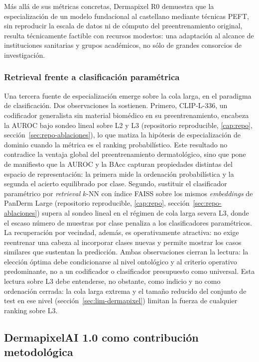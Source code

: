 Más allá de sus métricas concretas, Dermapixel R0 demuestra que la
especialización de un modelo fundacional al castellano mediante
técnicas PEFT, sin reproducir la escala de datos ni de cómputo del
preentrenamiento original, resulta técnicamente factible con recursos
modestos: una adaptación al alcance de instituciones sanitarias y
grupos académicos, no sólo de grandes consorcios de investigación.

\subsubsection{Retrieval frente a clasificación paramétrica}
\label{sec:disc-retrieval}

Una tercera fuente de especialización emerge sobre la cola larga, en
el paradigma de clasificación. Dos observaciones la sostienen.
Primero, CLIP-L-336, un codificador generalista sin material
biomédico en su preentrenamiento, encabeza la AUROC bajo sondeo lineal
sobre L2 y L3 (repositorio reproducible, \ref{cap:repo}, sección~\ref{sec:repo-ablaciones}), lo que
matiza la hipótesis de especialización de dominio cuando la métrica es
el ranking probabilístico. Este resultado no contradice la ventaja
global del preentrenamiento dermatológico, sino que pone de manifiesto
que la AUROC y la BAcc capturan propiedades distintas del espacio de
representación: la primera mide la ordenación probabilística y la
segunda el acierto equilibrado por clase. Segundo, sustituir el clasificador
paramétrico por \emph{retrieval} $k$-NN con índice FAISS sobre los
mismos \emph{embeddings} de PanDerm Large
(repositorio reproducible, \ref{cap:repo}, sección~\ref{sec:repo-ablaciones}) supera al sondeo lineal en
el régimen de cola larga severa L3, donde el escaso número de muestras
por clase penaliza a los clasificadores paramétricos. La recuperación
por vecindad, además, es operativamente atractiva: no exige reentrenar
una cabeza al incorporar clases nuevas y permite mostrar los casos
similares que sustentan la predicción. Ambas observaciones cierran la
lectura: la elección óptima debe condicionarse al nivel ontológico y
al criterio operativo predominante, no a un codificador o clasificador
presupuesto como universal. Esta lectura sobre L3 debe entenderse, no
obstante, como indicio y no como ordenación cerrada: la cola larga
extrema y el tamaño reducido del conjunto de test en ese nivel
(sección~\ref{sec:lim-dermapixel}) limitan la fuerza de cualquier
ranking sobre L3.

\subsection{DermapixelAI 1.0 como contribución metodológica}
\label{sec:disc-dermapixel-contrib}

